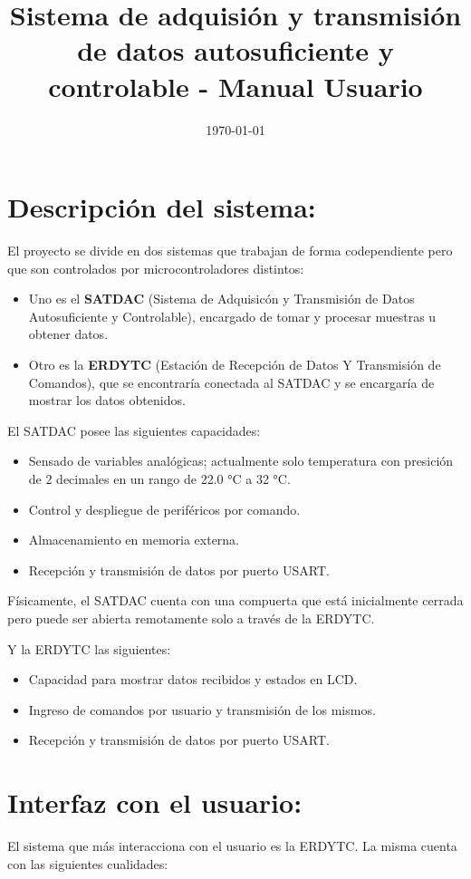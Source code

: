 \documentclass[conference]{IEEEtran}
\date{\today}
\title{Sistema de adquisión y transmisión de datos autosuficiente y controlable - Manual Usuario}
\begin{document}
\maketitle
\tableofcontents


\section{Descripción del sistema:}
\label{sec:org0377d17}

El proyecto se divide en dos sistemas que trabajan de forma codependiente pero que son controlados por microcontroladores distintos:

\begin{itemize}
\item Uno es el \textbf{SATDAC} (Sistema de Adquisicón y Transmisión de Datos Autosuficiente y Controlable), encargado de tomar y procesar muestras u obtener datos.
\item Otro es la \textbf{ERDYTC} (Estación de Recepción de Datos Y Transmisión de Comandos), que se encontraría conectada al SATDAC y se encargaría de mostrar los datos obtenidos.
\end{itemize}

El SATDAC posee las siguientes capacidades:

\begin{itemize}
\item Sensado de variables analógicas; actualmente solo temperatura con presición de 2 decimales en un rango de 22.0 °C a 32 °C.
\item Control y despliegue de periféricos por comando.
\item Almacenamiento en memoria externa.
\item Recepción y transmisión de datos por puerto USART.
\end{itemize}

Físicamente, el SATDAC cuenta con una compuerta que está inicialmente cerrada pero puede ser abierta remotamente solo a través de la ERDYTC.

Y la ERDYTC las siguientes:

\begin{itemize}
\item Capacidad para mostrar datos recibidos y estados en LCD.
\item Ingreso de comandos por usuario y transmisión de los mismos.
\item Recepción y transmisión de datos por puerto USART.
\end{itemize}
\section{Interfaz con el usuario:}
\label{sec:org2e6d0df}
El sistema que más interacciona con el usuario es la ERDYTC. La misma cuenta con las siguientes cualidades:
\end{document}
